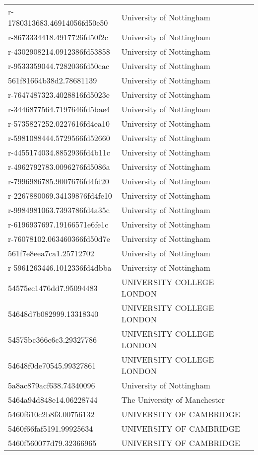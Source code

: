 \begin{tabular}{ll}
r-1780313683.46914056fd50e50 & University of Nottingham \\
r-8673334418.4917726fd50f2c & University of Nottingham \\
r-4302908214.0912386fd53858 & University of Nottingham \\
r-9533359044.7282036fd50cac & University of Nottingham \\
561f81664b38d2.78681139 & University of Nottingham \\
r-7647487323.4028816fd5023e & University of Nottingham \\
r-3446877564.7197646fd5bae4 & University of Nottingham \\
r-5735827252.0227616fd4ea10 & University of Nottingham \\
r-5981088444.5729566fd52660 & University of Nottingham \\
r-4455174034.8852936fd4b11c & University of Nottingham \\
r-4962792783.0096276fd5086a & University of Nottingham \\
r-7996986785.9007676fd4fd20 & University of Nottingham \\
r-2267880069.34139876fd4fe10 & University of Nottingham \\
r-9984981063.7393786fd4a35c & University of Nottingham \\
r-6196937697.19166571e6fe1c & University of Nottingham \\
r-76078102.063460366fd50d7e & University of Nottingham \\
561f7e8eea7ca1.25712702 & University of Nottingham \\
r-5961263446.1012336fd4dbba & University of Nottingham \\
54575ec1476dd7.95094483 & UNIVERSITY COLLEGE LONDON \\
54648d7b082999.13318340 & UNIVERSITY COLLEGE LONDON \\
54575bc366e6c3.29327786 & UNIVERSITY COLLEGE LONDON \\
54648f0de70545.99327861 & UNIVERSITY COLLEGE LONDON \\
5a8ac879acf638.74340096 & University of Nottingham \\
5464a94d848e14.06228744 & The University of Manchester \\
5460f610c2b8f3.00756132 & UNIVERSITY OF CAMBRIDGE \\
5460f66faf5191.99925634 & UNIVERSITY OF CAMBRIDGE \\
5460f560077d79.32366965 & UNIVERSITY OF CAMBRIDGE \\

\end{tabular}
